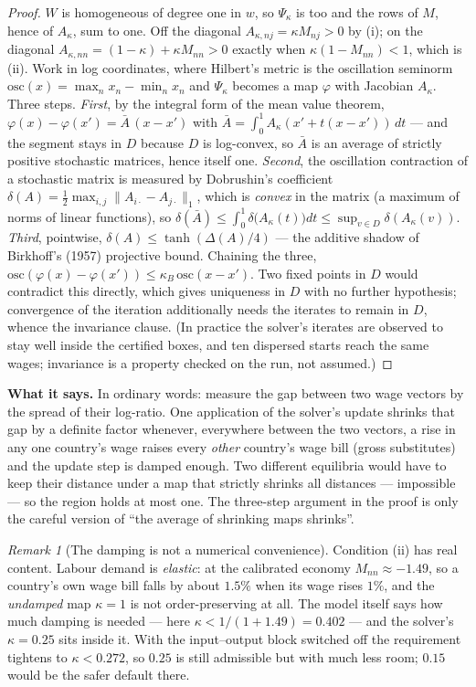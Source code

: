 \documentclass[11pt]{article}
\newcommand{\says}[1]{\smallskip\noindent\textbf{What it says.} #1\smallskip}
\theoremstyle{plain}
\theoremstyle{remark}
\newtheorem{remark}{Remark}
\theoremstyle{definition}
\begin{document}
\begin{proof}
$W$ is homogeneous of degree one in $w$, so $\Psi_\kappa$ is too and the rows of $M$,
hence of $A_\kappa$, sum to one. Off the diagonal $A_{\kappa,nj}=\kappa M_{nj}>0$ by (i);
on the diagonal $A_{\kappa,nn}=(1-\kappa)+\kappa M_{nn}>0$ exactly when
$\kappa(1-M_{nn})<1$, which is (ii). Work in log coordinates, where Hilbert's metric is
the oscillation seminorm $\mathrm{osc}(x)=\max_n x_n-\min_n x_n$ and $\Psi_\kappa$
becomes a map $\varphi$ with Jacobian $A_\kappa$. Three steps.
\emph{First}, by the integral form of the mean value theorem,
$\varphi(x)-\varphi(x')=\bar A\,(x-x')$ with $\bar A=\int_0^1 A_\kappa(x'+t(x-x'))\,dt$
--- and the segment stays in $D$ because $D$ is log-convex, so $\bar A$ is an average
of strictly positive stochastic matrices, hence itself one.
\emph{Second}, the oscillation contraction of a stochastic matrix is measured by
Dobrushin's coefficient $\delta(A)=\tfrac12\max_{i,j}\lVert A_{i\cdot}-A_{j\cdot}\rVert_1$,
which is \emph{convex} in the matrix (a maximum of norms of linear functions), so
$\delta(\bar A)\le\int_0^1\delta\bigl(A_\kappa(t)\bigr)dt\le\sup_{v\in D}\delta(A_\kappa(v))$.
\emph{Third}, pointwise, $\delta(A)\le\tanh(\Delta(A)/4)$ --- the additive shadow of
Birkhoff's (1957) projective bound. Chaining the three,
$\mathrm{osc}(\varphi(x)-\varphi(x'))\le\kappa_B\,\mathrm{osc}(x-x')$. Two fixed points
in $D$ would contradict this directly, which gives uniqueness in $D$ with no further
hypothesis; convergence of the iteration additionally needs the iterates to remain in
$D$, whence the invariance clause. (In practice the solver's iterates are observed to
stay well inside the certified boxes, and ten dispersed starts reach the same wages;
invariance is a property checked on the run, not assumed.)
\end{proof}

\says{In ordinary words: measure the gap between two wage vectors by the spread of
their log-ratio. One application of the solver's update shrinks that gap by a definite
factor whenever, everywhere between the two vectors, a rise in any one country's wage
raises every \emph{other} country's wage bill (gross substitutes) and the update step
is damped enough. Two different equilibria would have to keep their distance under a
map that strictly shrinks all distances --- impossible --- so the region holds at most
one. The three-step argument in the proof is only the careful version of ``the average
of shrinking maps shrinks''.}

\begin{remark}[The damping is not a numerical convenience]
Condition (ii) has real content. Labour demand is \emph{elastic}: at the calibrated
economy $M_{nn}\approx-1.49$, so a country's own wage bill falls by about $1.5\%$ when
its wage rises $1\%$, and the \emph{undamped} map $\kappa=1$ is not order-preserving at
all. The model itself says how much damping is needed --- here
$\kappa<1/(1+1.49)=0.402$ --- and the solver's $\kappa=0.25$ sits inside it. With the
input--output block switched off the requirement tightens to $\kappa<0.272$, so $0.25$
is still admissible but with much less room; $0.15$ would be the safer default there.
\end{remark}
\end{document}
